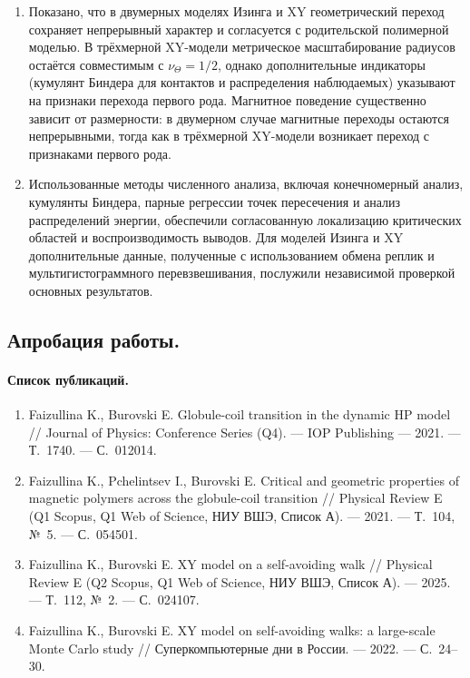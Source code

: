 \begin{enumerate}
	\item  Показано, что в двумерных моделях Изинга и XY геометрический переход
	сохраняет непрерывный характер и согласуется с родительской полимерной
	моделью. В трёхмерной XY-модели метрическое масштабирование радиусов
	остаётся совместимым с $\nu_{\Theta}=1/2$, однако дополнительные индикаторы
	(кумулянт Биндера для контактов и распределения наблюдаемых) указывают
	на признаки перехода первого рода. Магнитное поведение существенно зависит
	от размерности: в двумерном случае магнитные переходы остаются непрерывными,
	тогда как в трёхмерной XY-модели возникает переход с признаками первого рода.
	\item Использованные методы численного анализа, включая конечномерный анализ, кумулянты Биндера, парные регрессии точек пересечения и анализ распределений энергии, обеспечили согласованную локализацию критических областей и воспроизводимость выводов. Для моделей Изинга и XY дополнительные данные, полученные с использованием  обмена реплик и мультигистограммного перевзвешивания, послужили независимой проверкой основных результатов. 
	
	
\end{enumerate}


\subsection*{Апробация работы.}

\paragraph*{Список публикаций.}

\begin{enumerate}  

\item Faizullina K., Burovski E. Globule-coil transition in the dynamic HP model //
Journal of Physics: Conference Series (Q4). --- IOP Publishing --- 2021. --- Т.~1740. --- С.~012014.

\item Faizullina K., Pchelintsev I., Burovski E. Critical and geometric properties
of magnetic polymers across the globule-coil transition // Physical Review E
(Q1 Scopus, Q1 Web of Science, НИУ ВШЭ, Список А). --- 2021. --- Т.~104, №~5. --- С.~054501.

\item Faizullina K., Burovski E. XY model on a self-avoiding walk // Physical Review
E (Q2 Scopus, Q1 Web of Science, НИУ ВШЭ, Список А). --- 2025. --- Т.~112, №~2. --- С.~024107.

\item Faizullina K., Burovski E. XY model on self-avoiding walks: a large-scale
Monte Carlo study // Суперкомпьютерные дни в России. --- 2022. --- С.~24--30.


\end{enumerate} 

